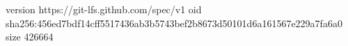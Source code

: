 version https://git-lfs.github.com/spec/v1
oid sha256:456ed7bdf14cff5517436ab3b5743bef2b8673d50101d6a161567e229a7fa6a0
size 426664
